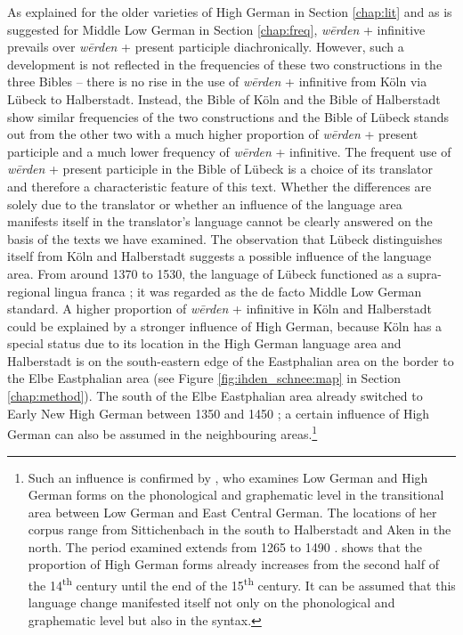 \documentclass[output=paper,colorlinks,citecolor=brown]{langscibook}
\begin{document}
As explained for the older varieties of High German in Section \ref{chap:lit} and as is suggested for Middle Low German in Section \ref{chap:freq}, \textit{wērden} + infinitive prevails over \textit{wērden} + present participle  diachronically. However, such a development is not reflected in the frequencies of these two constructions in the three Bibles -- there is no rise in the use of \textit{wērden} + infinitive from Köln via Lübeck to Halberstadt. Instead, the Bible of Köln and the Bible of Halberstadt show similar frequencies of the two constructions and the Bible of Lübeck stands out from the other two with a much higher proportion of \textit{wērden} + present participle and a much lower frequency of \textit{wērden} + infinitive. The frequent use of \textit{wērden} + present participle in the Bible of Lübeck is a choice of its translator and therefore a characteristic feature of this text. Whether the differences are solely due to the translator or whether an influence of the language area manifests itself in the translator's language cannot be clearly answered on the basis of the texts we have examined. The observation that Lübeck distinguishes itself from Köln and Halberstadt suggests a possible influence of the language area. From around 1370 to 1530, the language of Lübeck functioned as a supra-regional lingua franca \citep[1483]{Peters2000a}; it was regarded as the de facto Middle Low German standard. A higher proportion of \textit{wērden} + infinitive in Köln and Halberstadt could be explained by a stronger influence of High German, because Köln has a special status due to its location in the High German language area and Halberstadt is on the south-eastern edge of the Eastphalian area on the border to the Elbe Eastphalian area (see Figure \ref{fig:ihden_schnee:map} in Section \ref{chap:method}). The south of the Elbe Eastphalian area  already switched to Early New High German between 1350 and 1450 \citep[1417]{Peters2000b}; a certain influence of High German can also be assumed in the neighbouring areas.\footnote{Such an influence is confirmed by \citet{Czajkowski2021}, who examines Low German and High German forms on the phonological and graphematic level in the transitional area between Low German and East Central German. The locations of her corpus range from Sittichenbach in the south to Halberstadt and Aken in the north. The period examined extends from 1265 to 1490 \citep[31--36]{Czajkowski2021}. \citet[293--294]{Czajkowski2021} shows that the proportion of High German forms already increases from the second half of the 14\textsuperscript{th} century until the end of the 15\textsuperscript{th} century. It can be assumed that this language change manifested itself not only on the phonological and graphematic level but also in the syntax.}
\end{document}
